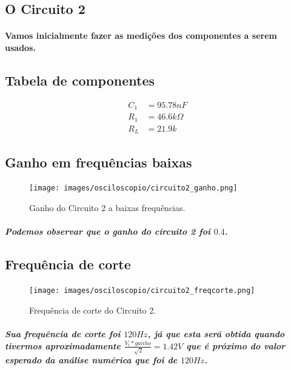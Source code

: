 \documentclass[12pt,twoside, a4paper, twocolumn]{article}
\begin{document}
\newpage


\subsection{O Circuito 2}


\paragraph{Vamos inicialmente fazer as medições dos componentes a serem usados.}


\subsection{Tabela de componentes}


\begin{equation*}
    \begin{aligned}
        C_1 & = 95.78nF         \\
        R_1 & = 46.6k \varOmega \\
        R_L & = 21.9k
    \end{aligned}
\end{equation*}


\subsection{Ganho em frequências baixas}


\begin{figure}[h]
    \centering
    \texttt{[image: images/osciloscopio/circuito2\_ganho.png]}
    \caption{Ganho do Circuito 2 a baixas frequências.}
\end{figure}


\subparagraph{Podemos observar que o ganho do circuito 2 foi $0.4$.}




\subsection{Frequência de corte}


\begin{figure}[h]
    \centering
    \texttt{[image: images/osciloscopio/circuito2\_freqcorte.png]}
    \caption{Frequência de corte do Circuito 2.}
\end{figure}


\subparagraph{Sua frequência de corte foi $120Hz$, já que esta será obtida quando tivermos aproximadamente $\frac{V_i * ganho}{\sqrt[]{2}} = 1.42V$ que é próximo do valor esperado da análise numérica que foi de $120Hz$.}
\end{document}
